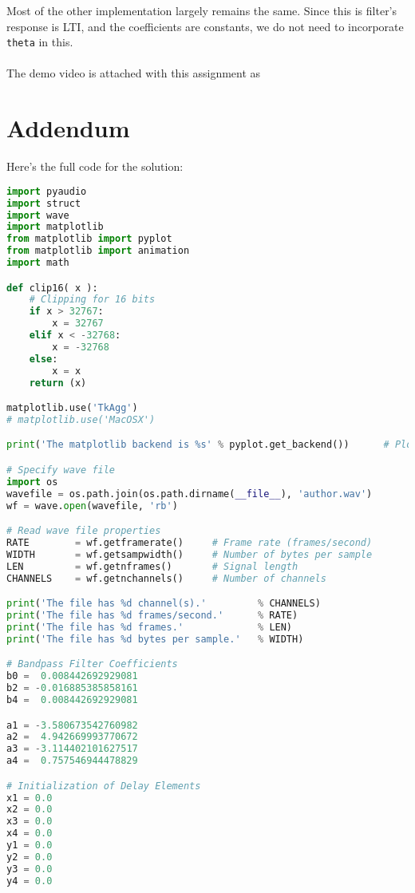 \documentclass[11pt]{article}
\begin{document}
Most of the other implementation largely remains the same. Since this is filter's response is LTI, and the coefficients are constants, we do not need to incorporate \texttt{theta} in this.
\\
\\
The demo video is attached with this assignment as 




\pagebreak
\section{Addendum}
Here's the full code for the solution:

\begin{lstlisting}[language=python, label={lst:code}, breaklines=true, caption={Full implementation}]
import pyaudio
import struct
import wave
import matplotlib
from matplotlib import pyplot
from matplotlib import animation
import math

def clip16( x ):    
    # Clipping for 16 bits
    if x > 32767:
        x = 32767
    elif x < -32768:
        x = -32768
    else:
        x = x        
    return (x)

matplotlib.use('TkAgg')
# matplotlib.use('MacOSX')

print('The matplotlib backend is %s' % pyplot.get_backend())      # Plotting backend

# Specify wave file
import os
wavefile = os.path.join(os.path.dirname(__file__), 'author.wav')
wf = wave.open(wavefile, 'rb')

# Read wave file properties
RATE        = wf.getframerate()     # Frame rate (frames/second)
WIDTH       = wf.getsampwidth()     # Number of bytes per sample
LEN         = wf.getnframes()       # Signal length
CHANNELS    = wf.getnchannels()     # Number of channels

print('The file has %d channel(s).'         % CHANNELS)
print('The file has %d frames/second.'      % RATE)
print('The file has %d frames.'             % LEN)
print('The file has %d bytes per sample.'   % WIDTH)

# Bandpass Filter Coefficients
b0 =  0.008442692929081
b2 = -0.016885385858161
b4 =  0.008442692929081

a1 = -3.580673542760982
a2 =  4.942669993770672
a3 = -3.114402101627517
a4 =  0.757546944478829

# Initialization of Delay Elements
x1 = 0.0
x2 = 0.0
x3 = 0.0
x4 = 0.0
y1 = 0.0
y2 = 0.0
y3 = 0.0
y4 = 0.0


\end{lstlisting}
\end{document}
